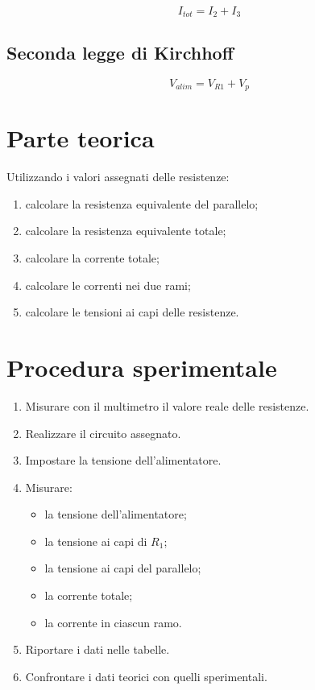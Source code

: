 \documentclass[a4paper,12pt]{article}
\begin{document}
\[
I_{tot} = I_2 + I_3
\]

\subsection*{Seconda legge di Kirchhoff}

\[
V_{alim} = V_{R1} + V_p
\]

\section*{Parte teorica}

Utilizzando i valori assegnati delle resistenze:

\begin{enumerate}[itemsep=0pt, topsep=1pt]
    \item calcolare la resistenza equivalente del parallelo;
    \item calcolare la resistenza equivalente totale;
    \item calcolare la corrente totale;
    \item calcolare le correnti nei due rami;
    \item calcolare le tensioni ai capi delle resistenze.
\end{enumerate}



\section*{Procedura sperimentale}

\begin{enumerate}[itemsep=0pt, topsep=1pt]
    \item Misurare con il multimetro il valore reale delle resistenze.
    \item Realizzare il circuito assegnato.
    \item Impostare la tensione dell’alimentatore.
    \item Misurare:
    \begin{itemize}[itemsep=0pt, topsep=1pt]
        \item la tensione dell’alimentatore;
        \item la tensione ai capi di $R_1$;
        \item la tensione ai capi del parallelo;
        \item la corrente totale;
        \item la corrente in ciascun ramo.
    \end{itemize}
    \item Riportare i dati nelle tabelle.
    \item Confrontare i dati teorici con quelli sperimentali.
\end{enumerate}
\end{document}
